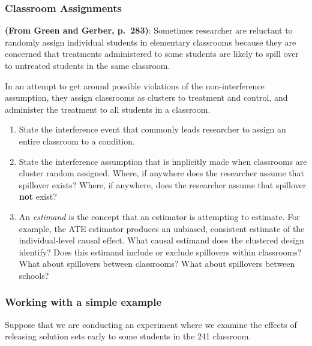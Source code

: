 \documentclass[
]{article}
\providecommand{\tightlist}{%
  \setlength{\itemsep}{0pt}\setlength{\parskip}{0pt}}
\begin{document}
\hypertarget{classroom-assignments}{%
\subsubsection{Classroom Assignments}\label{classroom-assignments}}

\textbf{(From Green and Gerber, p.~283)}: Sometimes researcher are reluctant to randomly assign individual students in elementary classrooms because they are concerned that treatments administered to some students are likely to spill over to untreated students in the same classroom.

In an attempt to get around possible violations of the non-interference assumption, they assign classrooms as clusters to treatment and control, and administer the treatment to all students in a classroom.

\begin{enumerate}
\def\labelenumi{\arabic{enumi}.}
\tightlist
\item
  State the interference event that commonly leads researcher to assign an entire classroom to a condition.
\item
  State the interference assumption that is implicitly made when classrooms are cluster random assigned. Where, if anywhere does the researcher assume that spillover exists? Where, if anywhere, does the researcher assume that spillover \textbf{not} exist?
\item
  An \emph{estimand} is the concept that an estimator is attempting to estimate. For example, the ATE estimator produces an unbiased, consistent estimate of the individual-level causal effect. What causal estimand does the clustered design identify? Does this estimand include or exclude spillovers within classrooms? What about spillovers between classrooms? What about spillovers between schools?
\end{enumerate}

\hypertarget{working-with-a-simple-example}{%
\subsubsection{Working with a simple example}\label{working-with-a-simple-example}}

Suppose that we are conducting an experiment where we examine the effects of releasing solution sets early to some students in the 241 classroom.
\end{document}
